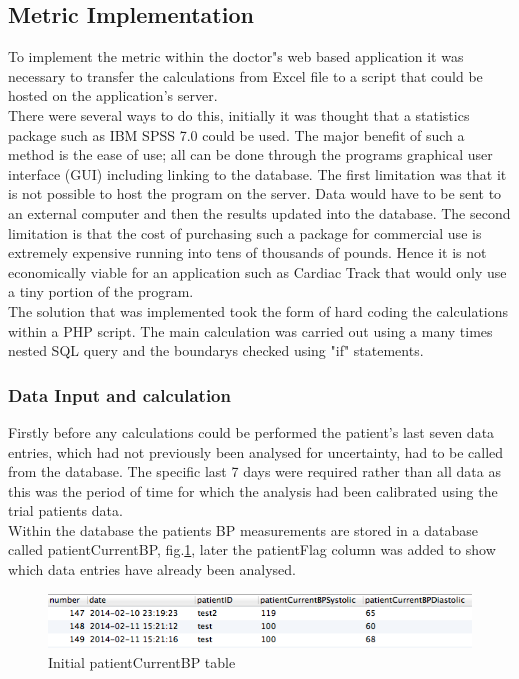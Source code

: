 \documentclass[11pt]{article}
\begin{document}
\subsection{Metric Implementation}
To implement the metric within the doctor"s web based application it was necessary to transfer the calculations from Excel file to a script that could be hosted on the application's server. 
\\ \indent There were several ways to do this, initially it was thought that a statistics package such as IBM SPSS 7.0 \cite{SPSS} could be used. The major benefit of such a method is the ease of use; all can be done through the programs graphical user interface (GUI) including linking to the database. The first limitation was that it is not possible to host the program on the server. Data would have to be sent to an external computer and then the results updated into the database. The second limitation is that the cost of purchasing such a package for commercial use is extremely expensive running into tens of thousands of pounds. Hence it is not economically viable for an application such as Cardiac Track that would only use a tiny portion of the program.
\\ \indent 
The solution that was implemented took the form of hard coding the calculations within a PHP script. The main calculation was carried out using a many times nested SQL query and the boundarys checked using "if" statements. 

\subsubsection{Data Input and calculation}
Firstly before any calculations could be performed the patient's last seven data entries, which had not previously been analysed for uncertainty, had to be called from the database. The specific last 7 days were required rather than all data as this was the period of time for which the analysis had been calibrated using the trial patients data.
\\ \indent 
Within the database the patients BP measurements are stored in a database called patientCurrentBP, fig.\ref{DB1}, later the patientFlag column was added to show which data entries have already been analysed.

\begin{figure}
\centering
\includegraphics[scale=0.4]{DB1.png}
\caption{Initial patientCurrentBP table \label{DB1}} 
\end{figure} 
\end{document}
